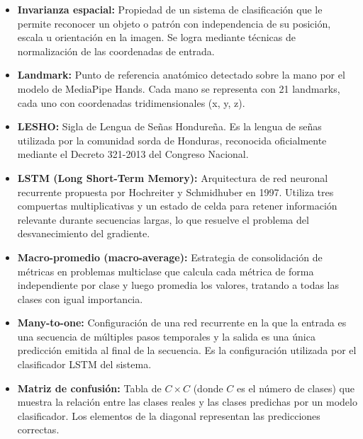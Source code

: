 \begin{itemize}
    \item[] \textbf{Invarianza espacial:} Propiedad de un sistema de clasificación que le permite reconocer un objeto o patrón con independencia de su posición, escala u orientación en la imagen. Se logra mediante técnicas de normalización de las coordenadas de entrada.\\

    \item[] \textbf{Landmark:} Punto de referencia anatómico detectado sobre la mano por el modelo de MediaPipe Hands. Cada mano se representa con 21 landmarks, cada uno con coordenadas tridimensionales (x, y, z).\\

    \item[] \textbf{LESHO:} Sigla de Lengua de Señas Hondureña. Es la lengua de señas utilizada por la comunidad sorda de Honduras, reconocida oficialmente mediante el Decreto 321-2013 del Congreso Nacional.\\

    \item[] \textbf{LSTM (Long Short-Term Memory):} Arquitectura de red neuronal recurrente propuesta por Hochreiter y Schmidhuber en 1997. Utiliza tres compuertas multiplicativas y un estado de celda para retener información relevante durante secuencias largas, lo que resuelve el problema del desvanecimiento del gradiente.\\

    \item[] \textbf{Macro-promedio (macro-average):} Estrategia de consolidación de métricas en problemas multiclase que calcula cada métrica de forma independiente por clase y luego promedia los valores, tratando a todas las clases con igual importancia.\\

    \item[] \textbf{Many-to-one:} Configuración de una red recurrente en la que la entrada es una secuencia de múltiples pasos temporales y la salida es una única predicción emitida al final de la secuencia. Es la configuración utilizada por el clasificador LSTM del sistema.\\

    \item[] \textbf{Matriz de confusión:} Tabla de $C \times C$ (donde $C$ es el número de clases) que muestra la relación entre las clases reales y las clases predichas por un modelo clasificador. Los elementos de la diagonal representan las predicciones correctas.\\


\end{itemize}
